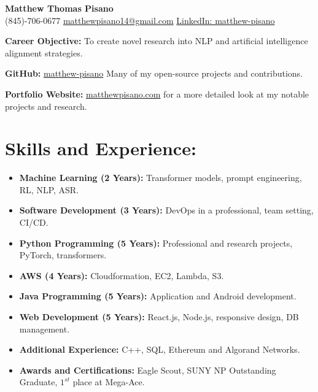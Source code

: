 \documentclass[12pt]{article}
\title{}
\author{\textbf{\LARGE Matthew Thomas Pisano}}
\date{}
\begin{document}
\pagestyle{plain}

\begin{tcolorbox}[width=\linewidth, sharp corners=all, colback=white!90!green, colframe=black]
    
    \begin{center}
        \textbf{\LARGE Matthew Thomas Pisano}\\
        \vspace{0.1in}
        (845)-706-0677 \hspace*{0.3in}
        \href{mailto:matthewpisano14@gmail.com}{matthewpisano14@gmail.com} \hspace*{0.5in}
        \href{https://www.linkedin.com/in/matthew-pisano/}{LinkedIn: matthew-pisano}
    \end{center}
    
\end{tcolorbox}

\vspace{0.1in}

\hspace*{-0.3in}
\textbf{Career Objective:} To create novel research into NLP and artificial intelligence alignment strategies.

\vspace{0.1in}

\hspace*{-0.3in}
\textbf{GitHub:} \href{https://github.com/matthew-pisano}{matthew-pisano} Many of my open-source projects and contributions.

\hspace*{-0.3in}
\textbf{Portfolio Website:} \href{https://matthewpisano.com}{matthewpisano.com} for a more detailed look at my notable projects and research.

\section*{Skills and Experience:}
\begin{itemize}
    \itemsep0em
    \item \textbf{Machine Learning (2 Years):} Transformer models, prompt engineering, RL, NLP, ASR.
    \item \textbf{Software Development (3 Years):} DevOps in a professional, team setting, CI/CD. 
    \item \textbf{Python Programming (5 Years):} Professional and research projects, PyTorch, transformers.
    \item \textbf{AWS (4 Years):} Cloudformation, EC2, Lambda, S3.
    \item \textbf{Java Programming (5 Years):} Application and Android development.
    \item \textbf{Web Development (5 Years):} React.js, Node.js, responsive design, DB management.
    \item \textbf{Additional Experience:} C++, SQL, Ethereum and Algorand Networks.
    \item \textbf{Awards and Certifications:} Eagle Scout, SUNY NP Outstanding Graduate, $1^{st}$ place at Mega-Ace.
\end{itemize}
\end{document}
